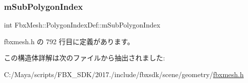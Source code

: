\mbox{\label{struct_fbx_mesh_1_1_polygon_index_def_a082dbd8eba06dff88ab65e33c1582005}} 
\subsubsection{\texorpdfstring{m\+Sub\+Polygon\+Index}{mSubPolygonIndex}}
{\footnotesize\ttfamily int Fbx\+Mesh\+::\+Polygon\+Index\+Def\+::m\+Sub\+Polygon\+Index}



 fbxmesh.\+h の 792 行目に定義があります。



この構造体詳解は次のファイルから抽出されました\+:\begin{DoxyCompactItemize}
\item 
C\+:/\+Maya/scripts/\+F\+B\+X\+\_\+\+S\+D\+K/2017./include/fbxsdk/scene/geometry/\hyperlink{fbxmesh_8h}{fbxmesh.\+h}\end{DoxyCompactItemize}
